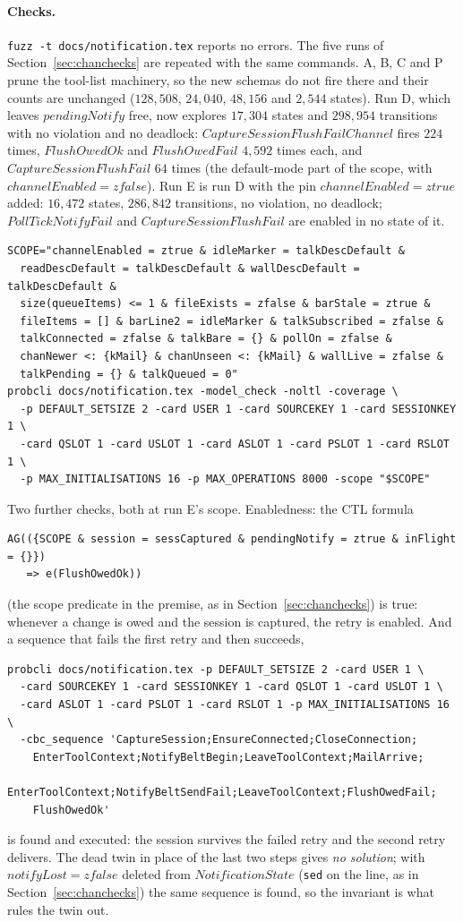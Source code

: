 \documentclass[a4paper,10pt,fleqn]{article}
\begin{document}
\paragraph{Checks.}  \texttt{fuzz -t docs/notification.tex} reports no errors.
The five runs of Section~\ref{sec:chanchecks} are repeated with the same
commands.  A, B, C and P prune the tool-list machinery, so the new schemas do
not fire there and their counts are unchanged ($128{,}508$, $24{,}040$,
$48{,}156$ and $2{,}544$ states).  Run D, which leaves $pendingNotify$ free,
now explores $17{,}304$ states and $298{,}954$ transitions with no violation
and no deadlock: $CaptureSessionFlushFailChannel$ fires $224$ times,
$FlushOwedOk$ and $FlushOwedFail$ $4{,}592$ times each, and
$CaptureSessionFlushFail$ $64$ times (the default-mode part of the scope, with
$channelEnabled = zfalse$).  Run E is run D with the pin
$channelEnabled = ztrue$ added: $16{,}472$ states, $286{,}842$ transitions,
no violation, no deadlock; $PollTickNotifyFail$ and $CaptureSessionFlushFail$
are enabled in no state of it.
\begin{verbatim}
SCOPE="channelEnabled = ztrue & idleMarker = talkDescDefault &
  readDescDefault = talkDescDefault & wallDescDefault = talkDescDefault &
  size(queueItems) <= 1 & fileExists = zfalse & barStale = ztrue &
  fileItems = [] & barLine2 = idleMarker & talkSubscribed = zfalse &
  talkConnected = zfalse & talkBare = {} & pollOn = zfalse &
  chanNewer <: {kMail} & chanUnseen <: {kMail} & wallLive = zfalse &
  talkPending = {} & talkQueued = 0"
probcli docs/notification.tex -model_check -noltl -coverage \
  -p DEFAULT_SETSIZE 2 -card USER 1 -card SOURCEKEY 1 -card SESSIONKEY 1 \
  -card QSLOT 1 -card USLOT 1 -card ASLOT 1 -card PSLOT 1 -card RSLOT 1 \
  -p MAX_INITIALISATIONS 16 -p MAX_OPERATIONS 8000 -scope "$SCOPE"
\end{verbatim}
Two further checks, both at run E's scope.  Enabledness: the CTL formula
\begin{verbatim}
AG(({SCOPE & session = sessCaptured & pendingNotify = ztrue & inFlight = {}})
   => e(FlushOwedOk))
\end{verbatim}
(the scope predicate in the premise, as in Section~\ref{sec:chanchecks}) is
true: whenever a change is owed and the session is captured, the retry is
enabled.  And a sequence that fails the first retry and then succeeds,
\begin{verbatim}
probcli docs/notification.tex -p DEFAULT_SETSIZE 2 -card USER 1 \
  -card SOURCEKEY 1 -card SESSIONKEY 1 -card QSLOT 1 -card USLOT 1 \
  -card ASLOT 1 -card PSLOT 1 -card RSLOT 1 -p MAX_INITIALISATIONS 16 \
  -cbc_sequence 'CaptureSession;EnsureConnected;CloseConnection;
    EnterToolContext;NotifyBeltBegin;LeaveToolContext;MailArrive;
    EnterToolContext;NotifyBeltSendFail;LeaveToolContext;FlushOwedFail;
    FlushOwedOk'
\end{verbatim}
is found and executed: the session survives the failed retry and the second
retry delivers.  The dead twin in place of the last two steps gives \emph{no
solution}; with $notifyLost = zfalse$ deleted from $NotificationState$
(\texttt{sed} on the line, as in Section~\ref{sec:chanchecks}) the same
sequence is found, so the invariant is what rules the twin out.
\end{document}
